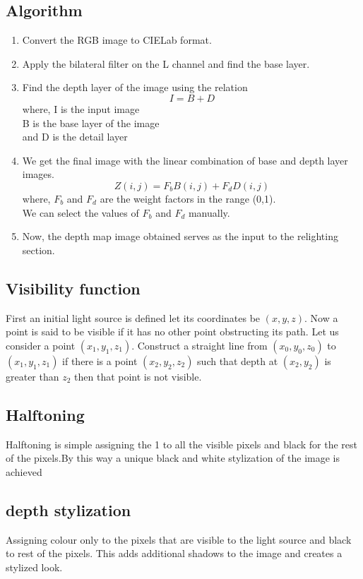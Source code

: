 \documentclass[conference]{IEEEtran}
\begin{document}
  \subsection{Algorithm}
  \begin{enumerate}
  \item  Convert the RGB image to CIELab format.
  \item Apply the bilateral filter on the L channel and find the base layer.
  \item Find the depth layer of the image using the relation
  $$I = B +D$$
  where, I is the input image\\
  B is the base layer of the image \\
  and D is the detail layer
  \item  We get the final image with the linear combination of base and depth layer images.
  $$ Z(i,j) = F_bB(i,j) +F_dD(i,j)$$
  where, $F_b$ and $F_d$ are the weight factors in the range (0,1).\\
  We can select the values of $F_b$ and $F_d$ manually.
  \item  Now, the depth map image obtained serves as the input to the relighting section.
  \end{enumerate}
  
  \subsection{Visibility function}
  First an initial light source is defined let its coordinates be $(x,y,z)$. Now a point is said to be visible if it has no other point obstructing its path. Let us consider a point $(x_1,y_1,z_1)$. Construct a straight line from $(x_0,y_0,z_0)$ to $(x_1,y_1,z_1)$  if there is a point $(x_2,y_2,z_2)$ such that depth at $(x_2,y_2)$ is greater than $z_2$ then that point is not visible.
  
  \subsection{Halftoning}
  Halftoning is simple assigning the 1 to all the visible pixels and black for the rest of the pixels.By this way a unique black and white stylization of the image is achieved
  
  \subsection{depth stylization}
  Assigning colour only to the pixels that are visible to the light source and black to rest of the pixels. This adds additional shadows to the image and creates a stylized look.
  
\end{document}
